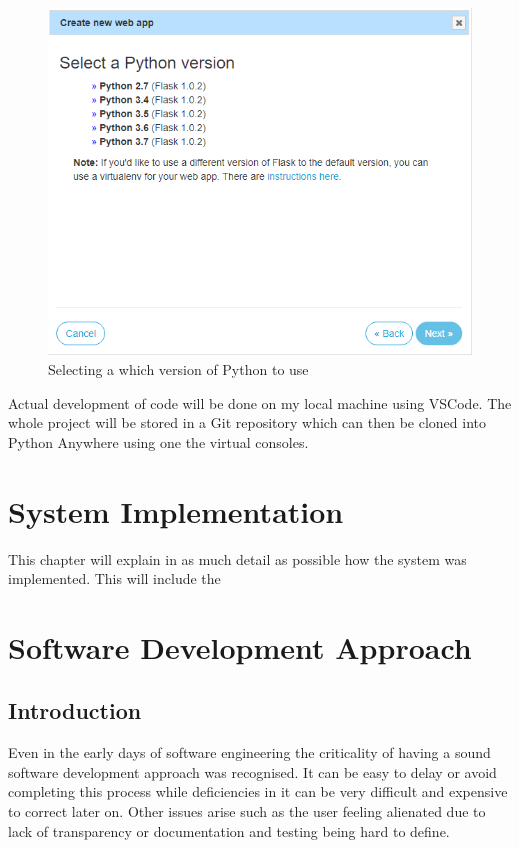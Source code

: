 \documentclass[10pt,a4paper]{article}
\begin{document}
\begin{figure}[H]
\centering
  \includegraphics[width=\linewidth]{images/webapppython.png}
  \caption{Selecting a which version of Python to use}
  \label{fig:picamera}
\end{figure}

Actual development of code will be done on my local machine using VSCode. The whole project will be stored in a Git repository which can then be cloned into Python Anywhere using one the virtual consoles. 

\section{System Implementation}
This chapter will explain in as much detail as possible how the system was implemented. This will include the 


\section{Software Development Approach}
\subsection{Introduction}
Even in the early days of software engineering the criticality of having a sound software development approach was recognised. It can be easy to delay or avoid completing this process while deficiencies in it can be very difficult and expensive to correct later on. Other issues arise such as the user feeling alienated due to lack of transparency or documentation and testing being hard to define\citep{1674590}.
\end{document}
